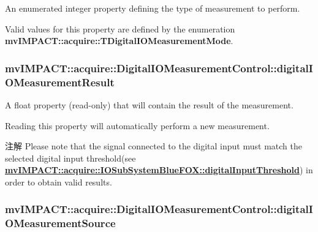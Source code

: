 An enumerated integer property defining the type of measurement to perform. 

Valid values for this property are defined by the enumeration {\bfseries mv\+I\+M\+P\+A\+C\+T\+::acquire\+::\+T\+Digital\+I\+O\+Measurement\+Mode}. \hypertarget{classmv_i_m_p_a_c_t_1_1acquire_1_1_digital_i_o_measurement_control_a366d4a9085aedbfb4c40d3b99df5401e}{
\subsubsection[{digital\+I\+O\+Measurement\+Result}]{ mv\+I\+M\+P\+A\+C\+T\+::acquire\+::\+Digital\+I\+O\+Measurement\+Control\+::digital\+I\+O\+Measurement\+Result}}\label{classmv_i_m_p_a_c_t_1_1acquire_1_1_digital_i_o_measurement_control_a366d4a9085aedbfb4c40d3b99df5401e}


A float property {\bfseries }(read-\/only) that will contain the result of the measurement. 

Reading this property will automatically perform a new measurement.

\begin{DoxyNote}{注解}
Please note that the signal connected to the digital input must match the selected digital input threshold(see {\bfseries \hyperlink{classmv_i_m_p_a_c_t_1_1acquire_1_1_i_o_sub_system_blue_f_o_x_ab091e761b1045dbe668c16019cfe8292}{mv\+I\+M\+P\+A\+C\+T\+::acquire\+::\+I\+O\+Sub\+System\+Blue\+F\+O\+X\+::digital\+Input\+Threshold}}) in order to obtain valid results. 
\end{DoxyNote}
\hypertarget{classmv_i_m_p_a_c_t_1_1acquire_1_1_digital_i_o_measurement_control_aa50e2191075d8064026be33ce2d883dc}{
\subsubsection[{digital\+I\+O\+Measurement\+Source}]{ mv\+I\+M\+P\+A\+C\+T\+::acquire\+::\+Digital\+I\+O\+Measurement\+Control\+::digital\+I\+O\+Measurement\+Source}}\label{classmv_i_m_p_a_c_t_1_1acquire_1_1_digital_i_o_measurement_control_aa50e2191075d8064026be33ce2d883dc}



